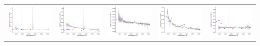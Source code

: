 \begin{center}
\begin{longtable}{l l l l l }
    \includegraphics[width=0.19\linewidth, clip]{Figs/Figs-sdss/spec-0285-51930-0042-SPLUS-n02s23-042426.pdf} & \includegraphics[width=0.19\linewidth, clip]{Figs/Figs-sdss/spec-0285-51930-0049-SPLUS-n02s23-042530.pdf} & \includegraphics[width=0.19\linewidth, clip]{Figs/Figs-sdss/spec-0285-51930-0521-SPLUS-n02n23-022190.pdf} & \includegraphics[width=0.19\linewidth, clip]{Figs/Figs-sdss/spec-0285-51930-0549-SPLUS-n01s23-038457.pdf} & \includegraphics[width=0.19\linewidth, clip]{Figs/Figs-sdss/spec-0287-52023-0264-SPLUS-n02s24-039734.pdf} \\

\end{longtable}
\end{center}
